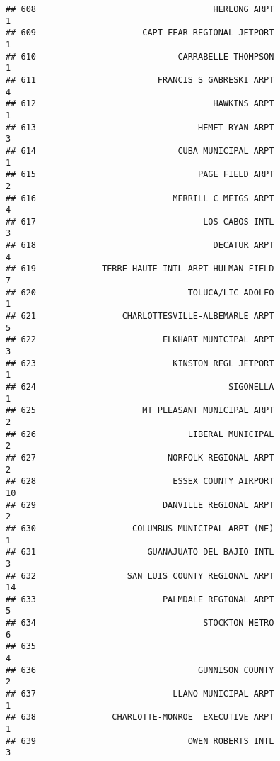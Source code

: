 \documentclass[
]{article}
\begin{document}
\begin{verbatim}
## 608                                   HERLONG ARPT                           1
## 609                     CAPT FEAR REGIONAL JETPORT                           1
## 610                            CARRABELLE-THOMPSON                           1
## 611                        FRANCIS S GABRESKI ARPT                           4
## 612                                   HAWKINS ARPT                           1
## 613                                HEMET-RYAN ARPT                           3
## 614                            CUBA MUNICIPAL ARPT                           1
## 615                                PAGE FIELD ARPT                           2
## 616                           MERRILL C MEIGS ARPT                           4
## 617                                 LOS CABOS INTL                           3
## 618                                   DECATUR ARPT                           4
## 619             TERRE HAUTE INTL ARPT-HULMAN FIELD                           7
## 620                              TOLUCA/LIC ADOLFO                           1
## 621                 CHARLOTTESVILLE-ALBEMARLE ARPT                           5
## 622                         ELKHART MUNICIPAL ARPT                           3
## 623                           KINSTON REGL JETPORT                           1
## 624                                      SIGONELLA                           1
## 625                     MT PLEASANT MUNICIPAL ARPT                           2
## 626                              LIBERAL MUNICIPAL                           2
## 627                          NORFOLK REGIONAL ARPT                           2
## 628                           ESSEX COUNTY AIRPORT                          10
## 629                         DANVILLE REGIONAL ARPT                           2
## 630                   COLUMBUS MUNICIPAL ARPT (NE)                           1
## 631                      GUANAJUATO DEL BAJIO INTL                           3
## 632                  SAN LUIS COUNTY REGIONAL ARPT                          14
## 633                         PALMDALE REGIONAL ARPT                           5
## 634                                 STOCKTON METRO                           6
## 635                                                                          4
## 636                                GUNNISON COUNTY                           2
## 637                           LLANO MUNICIPAL ARPT                           1
## 638               CHARLOTTE-MONROE  EXECUTIVE ARPT                           1
## 639                              OWEN ROBERTS INTL                           3

\end{verbatim}
\end{document}

